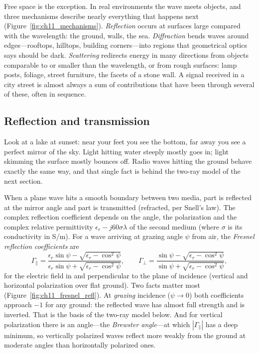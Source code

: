 Free space is the exception. In real environments the wave meets objects, and three
mechanisms describe nearly everything that happens next (Figure~\ref{fig:ch11_mechanisms}).
\emph{Reflection} occurs at surfaces large compared with the wavelength: the ground, walls,
the sea. \emph{Diffraction} bends waves around edges---rooftops, hilltops, building
corners---into regions that geometrical optics says should be dark. \emph{Scattering} redirects
energy in many directions from objects comparable to or smaller than the wavelength, or from
rough surfaces: lamp posts, foliage, street furniture, the facets of a stone wall. A signal
received in a city street is almost always a sum of contributions that have been through
several of these, often in sequence.



\subsection{Reflection and transmission}

Look at a lake at sunset: near your feet you see the bottom, far away you see a perfect mirror
of the sky. Light hitting water steeply mostly goes in; light skimming the surface mostly
bounces off. Radio waves hitting the ground behave exactly the same way, and that single fact is
behind the two-ray model of the next section.

When a plane wave hits a smooth boundary between two media, part is reflected at the mirror
angle and part is transmitted (refracted, per Snell's law). The complex reflection coefficient
depends on the angle, the polarization and the complex relative permittivity
$\epsilon_r-j60\sigma\lambda$ of the second medium (where $\sigma$ is its conductivity in S/m).
For a wave arriving at grazing angle $\psi$ from air, the \emph{Fresnel reflection coefficients}
are
\begin{equation}
\Gamma_\parallel=\frac{\epsilon_r\sin\psi-\sqrt{\epsilon_r-\cos^2\psi}}{\epsilon_r\sin\psi+\sqrt{\epsilon_r-\cos^2\psi}},
\qquad
\Gamma_\perp=\frac{\sin\psi-\sqrt{\epsilon_r-\cos^2\psi}}{\sin\psi+\sqrt{\epsilon_r-\cos^2\psi}},
\label{eq:ch11:fresnelrefl}
\end{equation}
for the electric field in and perpendicular to the plane of incidence (vertical and horizontal
polarization over flat ground). Two facts matter most (Figure~\ref{fig:ch11_fresnel_refl}). At
\emph{grazing} incidence ($\psi\to0$) both coefficients approach $-1$ for any ground: the reflected
wave has almost full strength and is inverted. That is the basis of the two-ray model below. And
for vertical polarization there is an angle---the \emph{Brewster angle}---at which
$|\Gamma_\parallel|$ has a deep minimum, so vertically polarized waves reflect more weakly from
the ground at moderate angles than horizontally polarized ones.

